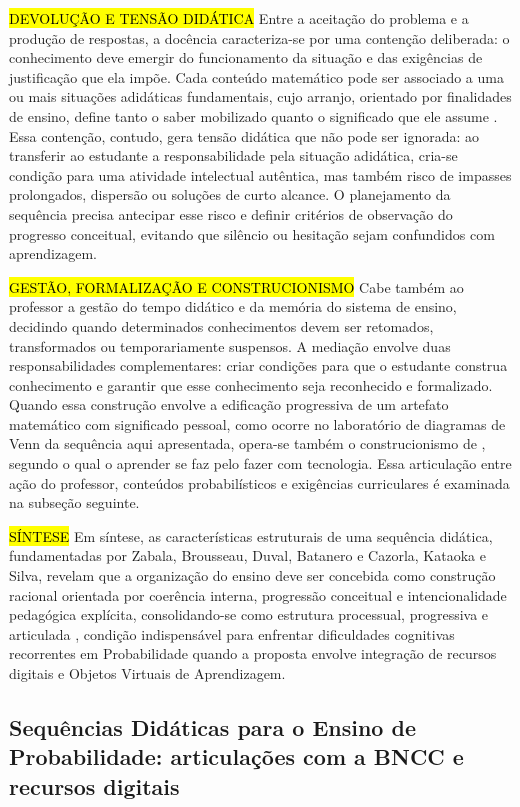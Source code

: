 {\hl {DEVOLUÇÃO E TENSÃO DIDÁTICA} Entre a aceitação do problema e a produção de respostas, a docência caracteriza-se por uma contenção deliberada: o conhecimento deve emergir do funcionamento da situação e das exigências de justificação que ela impõe. Cada conteúdo matemático pode ser associado a uma ou mais situações adidáticas fundamentais, cujo arranjo, orientado por finalidades de ensino, define tanto o saber mobilizado quanto o significado que ele assume \cite[p.~30-31, p.~230]{brousseau1997}. Essa contenção, contudo, gera tensão didática que não pode ser ignorada: ao transferir ao estudante a responsabilidade pela situação adidática, cria-se condição para uma atividade intelectual autêntica, mas também risco de impasses prolongados, dispersão ou soluções de curto alcance. O planejamento da sequência precisa antecipar esse risco e definir critérios de observação do progresso conceitual, evitando que silêncio ou hesitação sejam confundidos com aprendizagem.

\hl {GESTÃO, FORMALIZAÇÃO E CONSTRUCIONISMO} Cabe também ao professor a gestão do tempo didático e da memória do sistema de ensino, decidindo quando determinados conhecimentos devem ser retomados, transformados ou temporariamente suspensos. A mediação envolve duas responsabilidades complementares: criar condições para que o estudante construa conhecimento e garantir que esse conhecimento seja reconhecido e formalizado. Quando essa construção envolve a edificação progressiva de um artefato matemático com significado pessoal, como ocorre no laboratório de diagramas de Venn da sequência aqui apresentada, opera-se também o construcionismo de , segundo o qual o aprender se faz pelo fazer com tecnologia. Essa articulação entre ação do professor, conteúdos probabilísticos e exigências curriculares é examinada na subseção seguinte.

\hl {SÍNTESE} Em síntese, as características estruturais de uma sequência didática, fundamentadas por Zabala, Brousseau, Duval, Batanero e Cazorla, Kataoka e Silva, revelam que a organização do ensino deve ser concebida como construção racional orientada por coerência interna, progressão conceitual e intencionalidade pedagógica explícita, consolidando-se como estrutura processual, progressiva e articulada \cite[p.~231, p.~246]{brousseau1997}, condição indispensável para enfrentar dificuldades cognitivas recorrentes em Probabilidade quando a proposta envolve integração de recursos digitais e Objetos Virtuais de Aprendizagem.

\subsection{Sequências Didáticas para o Ensino de Probabilidade: articulações com a BNCC e recursos digitais}

}
